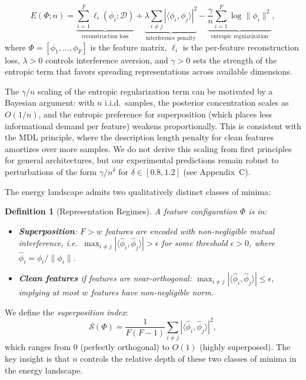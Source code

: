 \documentclass{article}
\newtheorem{definition}[theorem]{Definition}
\newcommand{\feat}{\phi}
\newcommand{\supidx}{\mathcal{S}}
\newcommand{\data}{\mathcal{D}}
\newcommand{\Fnum}{F}
\begin{document}
\begin{equation}
\label{eq:energy}
E(\Phi; n) = \underbrace{\sum_{i=1}^{\Fnum} \ell_i(\feat_i; \data)}_{\text{reconstruction loss}} + \underbrace{\lambda \sum_{i \neq j} |\langle \feat_i, \feat_j \rangle|^2}_{\text{interference penalty}} - \underbrace{\frac{\gamma}{n} \sum_{i=1}^{\Fnum} \log \|\feat_i\|^2}_{\text{entropic regularization}},
\end{equation}
where $\Phi = [\feat_1, \ldots, \feat_\Fnum]$ is the feature matrix, $\ell_i$ is the per-feature reconstruction loss, $\lambda > 0$ controls interference aversion, and $\gamma > 0$ sets the strength of the entropic term that favors spreading representations across available dimensions.

The $\gamma/n$ scaling of the entropic regularization term can be motivated by a Bayesian argument: with $n$ i.i.d.\ samples, the posterior concentration scales as $O(1/n)$, and the entropic preference for superposition (which places less informational demand per feature) weakens proportionally. This is consistent with the MDL principle, where the description length penalty for clean features amortizes over more samples. We do not derive this scaling from first principles for general architectures, but our experimental predictions remain robust to perturbations of the form $\gamma/n^{\delta}$ for $\delta \in [0.8, 1.2]$ (see Appendix~C).

The energy landscape admits two qualitatively distinct classes of minima:

\begin{definition}[Representation Regimes]
\label{def:regimes}
A feature configuration $\Phi$ is in:
\begin{itemize}
    \item \textbf{Superposition}: $\Fnum > w$ features are encoded with
    non-negligible mutual interference, i.e.\ $\max_{i \neq j} |\langle \hat{\feat}_i, \hat{\feat}_j \rangle| > \epsilon$
    for some threshold $\epsilon > 0$, where $\hat{\feat}_i = \feat_i / \|\feat_i\|$.
    \item \textbf{Clean features} if features are near-orthogonal: $\max_{i \neq j} |\langle \hat{\feat}_i, \hat{\feat}_j \rangle| \leq \epsilon$, implying at most $w$ features have non-negligible norm.
\end{itemize}
\end{definition}

We define the \emph{superposition index}:
\begin{equation}
\label{eq:superposition_index}
\supidx(\Phi) = \frac{1}{\Fnum(\Fnum-1)} \sum_{i \neq j} |\langle \hat{\feat}_i, \hat{\feat}_j \rangle|^2,
\end{equation}
which ranges from $0$ (perfectly orthogonal) to $O(1)$ (highly superposed).
The key insight is that $n$ controls the relative depth of these two classes of minima in the energy landscape.
\end{document}
